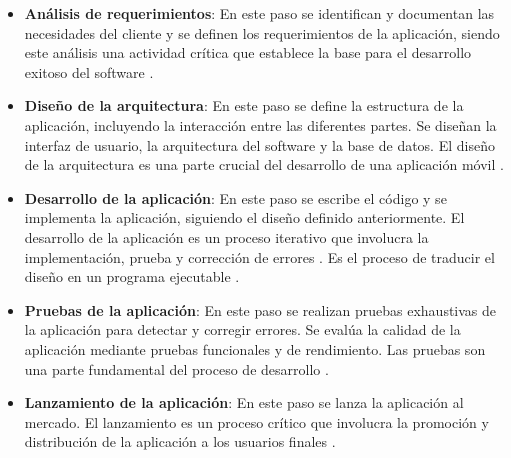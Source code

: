 \begin{itemize}
\item \textbf{Análisis de requerimientos}: En este paso se identifican y documentan las necesidades del cliente y se definen los requerimientos de la aplicación, siendo este análisis una actividad crítica que establece la base para el desarrollo exitoso del software \cite{book:ingenieria_del_software}.

\item \textbf{Diseño de la arquitectura}: En este paso se define la estructura de la aplicación, incluyendo la interacción entre las diferentes partes. Se diseñan la interfaz de usuario, la arquitectura del software y la base de datos. El diseño de la arquitectura es una parte crucial del desarrollo de una aplicación móvil \cite{art:mobile_application_development}.

\item \textbf{Desarrollo de la aplicación}: En este paso se escribe el código y se implementa la aplicación, siguiendo el diseño definido anteriormente. El desarrollo de la aplicación es un proceso iterativo que involucra la implementación, prueba y corrección de errores \cite{art:asana_proceso_desarrollo}. Es el proceso de traducir el diseño en un programa ejecutable \cite{book:ingenieria_software_pearson}.

\item \textbf{Pruebas de la aplicación}: En este paso se realizan pruebas exhaustivas de la aplicación para detectar y corregir errores. Se evalúa la calidad de la aplicación mediante pruebas funcionales y de rendimiento. Las pruebas son una parte fundamental del proceso de desarrollo \cite{book:tipos_pruebas_funcionales}.

\item \textbf{Lanzamiento de la aplicación}: En este paso se lanza la aplicación al mercado. El lanzamiento es un proceso crítico que involucra la promoción y distribución de la aplicación a los usuarios finales \cite{art:asana_proceso_desarrollo}.

\end{itemize}

